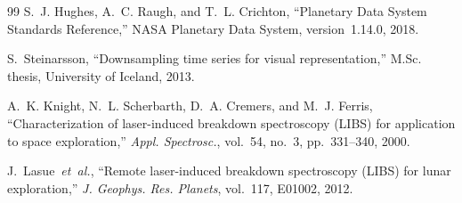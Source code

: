 \documentclass[a4paper,twocolumn,10pt]{article}
\begin{document}
\begin{thebibliography}{99}
S.~J. Hughes, A.~C. Raugh, and T.~L. Crichton,
``Planetary Data System Standards Reference,''
NASA Planetary Data System, version~1.14.0, 2018.

S.~Steinarsson,
``Downsampling time series for visual representation,''
M.Sc. thesis, University of Iceland, 2013.

A.~K. Knight, N.~L. Scherbarth, D.~A. Cremers, and M.~J. Ferris,
``Characterization of laser-induced breakdown spectroscopy (LIBS)
for application to space exploration,''
\textit{Appl. Spectrosc.}, vol.~54, no.~3, pp.~331--340, 2000.

J.~Lasue~\emph{et~al.},
``Remote laser-induced breakdown spectroscopy (LIBS) for lunar
exploration,''
\textit{J. Geophys. Res. Planets}, vol.~117, E01002, 2012.

\end{thebibliography}
\end{document}
